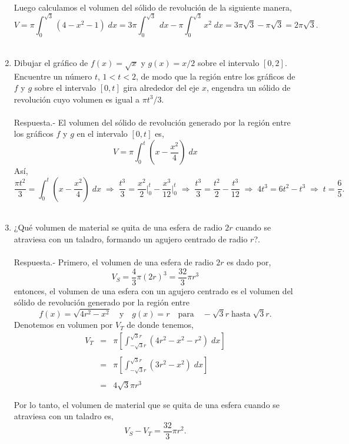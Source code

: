\begin{enumerate}
	Luego calculamos el volumen del sólido de revolución de la siguiente manera,
	$$V = \pi\int_0^{\sqrt{3}}(4-x^2-1)\; dx = 3\pi \int_0^{\sqrt{3}}\; dx - \pi\int_0^{\sqrt{3}} x^2\; dx = 3\pi \sqrt{3} - \pi\sqrt{3} = 2 \pi \sqrt{3} .$$\\

    \item Dibujar el gráfico de $f(x) = \sqrt{x}$ y $g(x)=x/2$ sobre el intervalo $[0,2]$. Encuentre un número $t$, $1<t<2$, de modo que la región entre los gráficos de $f$ y $g$ sobre el intervalo $[0,t]$ gira alrededor del eje $x$, engendra un sólido de revolución cuyo volumen es igual a $\pi t^3/3$.\\\\
	Respuesta.-\; El volumen del sólido de revolución generado por la región entre los gráficos $f$ y $g$ en el intervalo $[0,t]$ es,
	$$V=\pi\int_0^t \left(x-\dfrac{x^2}{4}\right)\; dx$$
	Así, 
	$$\dfrac{\pi t^2}{3} = \int_0^t \left(x-\dfrac{x^2}{4}\right)\; dx \;\Longrightarrow \; \dfrac{t^3}{3}=\dfrac{x^2}{2}\bigg|_0^t - \dfrac{x^3}{12}\bigg|_0^t \; \Longrightarrow \; \dfrac{t^3}{3} = \dfrac{t^2}{2} - \dfrac{t^3}{12} \; \Longrightarrow \; 4t^3 = 6t^2 - t^3 \; \Longrightarrow \; t=\dfrac{6}{5}.$$\\

    \item ¿Qué volumen de material se quita de una esfera de radio $2r$ cuando se atraviesa con un taladro, formando un agujero centrado de radio $r$?.\\\\
	Respuesta.-\; Primero, el volumen de una esfera de radio $2r$ es dado por,
	$$V_S = \dfrac{4}{3}\pi(2r)^3 = \dfrac{32}{3}\pi r^3$$
	entonces, el volumen de una esfera con un agujero centrado es el volumen del sólido de revolución generado por la región entre $$f(x) = \sqrt{4r^2 - x^2}\quad \mbox{y} \quad g(x)=r \quad \mbox{para}\quad -\sqrt{3}r \; \mbox{hasta} \; \sqrt{3}r.$$ 
	Denotemos en volumen por $V_T$ de donde tenemos,
	$$\begin{array}{rcl}
	    V_T&=&\pi \left[\int_{-\sqrt{3}r}^{\sqrt{3}r}(4r^2-x^2 - r^2)\; dx\right]\\\\
	       &=&\pi \left[\int_{-\sqrt{3}r}^{\sqrt{3}r} (3r^2 - x^2)\; dx\right]\\\\
	       &=&4\sqrt{3}\pi r^3\\\\
	\end{array}$$
	Por lo tanto, el volumen de material que se quita de una esfera cuando se atraviesa con un taladro es,
	$$V_S - V_T = \dfrac{32}{3}\pi r^2.$$\\


\end{enumerate}
